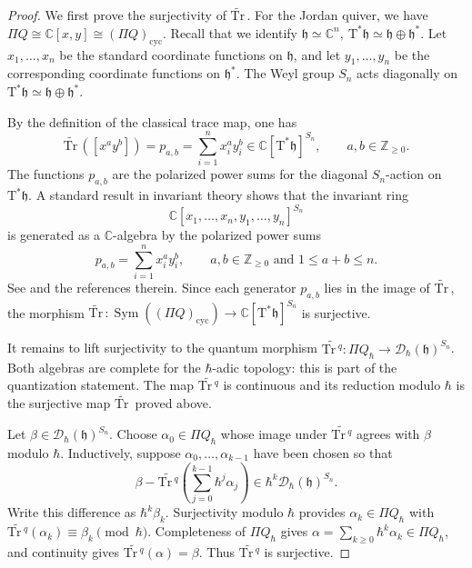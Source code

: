 \documentclass[11pt,reqno]{amsart}
\theoremstyle{definition}
\newcommand{\bbC}{\mathbb{C}}
\newcommand{\bbZ}{\mathbb{Z}}
\newcommand{\Tr}{\mathrm{Tr} \,}
\newcommand{\mD}{\mathcal{D}}
\newcommand{\cyc}{\mathrm{cyc}}
\newcommand{\Sym}{\operatorname{Sym}}
\newcommand{\fkh}{\mathfrak{h}}
\newcommand{\rmT}{\mathrm{T}}
\begin{document}
\begin{proof}
We first prove the surjectivity of \(\widetilde{\Tr}\).  
For the Jordan
quiver, we have
		\(\Pi Q\cong \bbC[x,y] \cong (\Pi Q)_\cyc\).
	Recall that we identify
	\(\fkh\simeq \bbC^n,\ 
		\rmT^\ast\fkh\simeq \fkh\oplus\fkh^\ast\).
	Let
	\(x_1,\dots,x_n\)
	be the standard coordinate functions on \(\fkh\), and let
	\(y_1,\dots,y_n\)
	be the corresponding coordinate functions on \(\fkh^\ast\).
	The Weyl group
	\(S_n\) acts diagonally on \(\rmT^\ast\fkh\simeq \fkh\oplus\fkh^\ast\).
	
	By the definition of the classical trace map, one has
	\[
	\widetilde{\Tr}([x^ay^b])
	=
	p_{a,b}
	=
	\sum_{i=1}^n x_i^ay_i^b
	\in
	\bbC[\rmT^\ast\fkh]^{S_n},\qquad a,b \in \bbZ_{\geq 0}.
	\]
	The functions \(p_{a,b}\) are the polarized power sums for the diagonal
	\(S_n\)-action on \(\rmT^\ast\fkh\).
	A standard result in invariant theory shows that
	the invariant ring
	\[
	\bbC[x_1,\dots,x_n,y_1,\dots,y_n]^{S_n}
	\]
	is generated as a \(\bbC\)-algebra by the polarized power sums
	\[
	p_{a,b}
	=
	\sum_{i=1}^n x_i^ay_i^b,
	\qquad a, b \in \bbZ_{\geq 0}\text{ and }
	1\leq a+b\leq n.
	\]
	See \cite[Theorem 2.5]{Dom2009Vec} and the references therein.
	Since each generator \(p_{a,b}\) lies in the image of
	\(\widetilde{\Tr}\), the morphism
	\(\widetilde{\Tr}:
	\Sym((\Pi Q)_\cyc)
	\longrightarrow
	\bbC[\rmT^\ast\fkh]^{S_n}\)
	is surjective.
	
	It remains to lift surjectivity to the quantum morphism
	\(\widetilde{\Tr^q}:
	\Pi Q_{\hbar}
	\longrightarrow
		\mD_\hbar(\fkh)^{S_n}\).
	Both algebras are complete for the \(\hbar\)-adic
	topology: this is part of the quantization statement.  The map \(\widetilde{\Tr^q}\) is continuous and
	its reduction modulo \(\hbar\) is the surjective map
	\(\widetilde{\Tr}\) proved above.

	Let \(\beta \in\mD_\hbar(\fkh)^{S_n}\).
	Choose \(\alpha_0\in\Pi Q_{\hbar}\)
	whose image under \(\widetilde{\Tr^q}\) agrees with \(\beta\) modulo \(\hbar\).  Inductively, suppose
	\(\alpha_0,\ldots,\alpha_{k-1}\) have been chosen so that
	\[
	\beta - \widetilde{\Tr^q}\!\left(\sum_{j=0}^{k-1}\hbar^j\alpha_j \right)
	\in \hbar^k\mD_\hbar(\fkh)^{S_n}.
	\]
	Write this difference as \(\hbar^k \beta_k\).  Surjectivity modulo \(\hbar\)
	provides \(\alpha_k \in \Pi Q_{\hbar}\) with
	\(\widetilde{\Tr^q}(\alpha_k) \equiv \beta_k \pmod \hbar \).
	Completeness of
	\(\Pi Q_{\hbar}\) gives
	\(\alpha=\sum_{k\geq0}\hbar^k\alpha_k \in \Pi Q_{\hbar}\), and continuity gives
	\(\widetilde{\Tr^q}(\alpha)=\beta\).  Thus \(\widetilde{\Tr^q}\) is surjective.
\end{proof}
\end{document}
